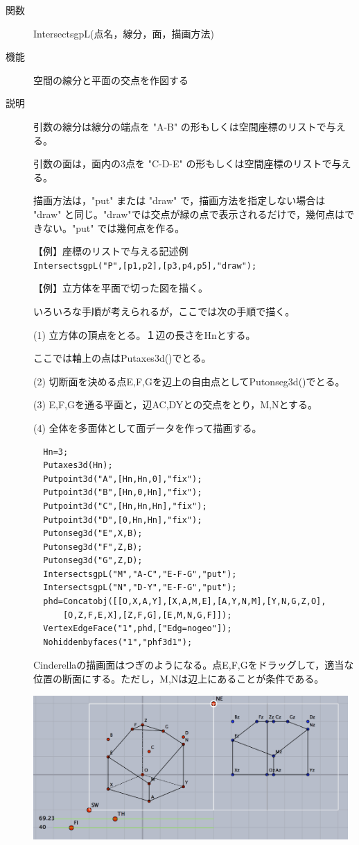 \documentclass[papersize,a4paper,12pt,uplatex]{jsarticle}
\begin{document}
\begin{description}
\vspace{\baselineskip}
\hypertarget{intersectsgpL}{}
\item[関数]  IntersectsgpL(点名，線分，面，描画方法)
\item[機能]  空間の線分と平面の交点を作図する
\item[説明]  引数の線分は線分の端点を "A-B" の形もしくは空間座標のリストで与える。

  引数の面は，面内の3点を "C-D-E" の形もしくは空間座標のリストで与える。
  
  描画方法は，"put" または "draw" で，描画方法を指定しない場合は "draw" と同じ。"draw"では交点が緑の点で表示されるだけで，幾何点はできない。"put" では幾何点を作る。
  
\vspace{\baselineskip}
【例】座標のリストで与える記述例\\
  \verb|IntersectsgpL("P",[p1,p2],[p3,p4,p5],"draw");| 
  
\vspace{\baselineskip}
【例】立方体を平面で切った図を描く。

   いろいろな手順が考えられるが，ここでは次の手順で描く。
   
 (1) 立方体の頂点をとる。１辺の長さをHnとする。
 
    ここでは軸上の点はPutaxes3d()でとる。
    
(2) 切断面を決める点E,F,Gを辺上の自由点としてPutonseg3d()でとる。

(3) E,F,Gを通る平面と，辺AC,DYとの交点をとり，M,Nとする。

(4) 全体を多面体として面データを作って描画する。
\begin{verbatim}
  Hn=3;
  Putaxes3d(Hn);
  Putpoint3d("A",[Hn,Hn,0],"fix");
  Putpoint3d("B",[Hn,0,Hn],"fix");
  Putpoint3d("C",[Hn,Hn,Hn],"fix");
  Putpoint3d("D",[0,Hn,Hn],"fix");
  Putonseg3d("E",X,B); 
  Putonseg3d("F",Z,B); 
  Putonseg3d("G",Z,D); 
  IntersectsgpL("M","A-C","E-F-G","put"); 
  IntersectsgpL("N","D-Y","E-F-G","put"); 
  phd=Concatobj([[O,X,A,Y],[X,A,M,E],[A,Y,N,M],[Y,N,G,Z,O],
      [O,Z,F,E,X],[Z,F,G],[E,M,N,G,F]]);
  VertexEdgeFace("1",phd,["Edg=nogeo"]);
  Nohiddenbyfaces("1","phf3d1"); 
\end{verbatim}
Cinderellaの描画面はつぎのようになる。点E,F,Gをドラッグして，適当な位置の断面にする。ただし，M,Nは辺上にあることが条件である。

\vspace{\baselineskip}
\includegraphics[bb=0 0 713.04 327.02 , width=12cm]{Fig/IntersectsgpL0.pdf}



\end{description}
\end{document}
